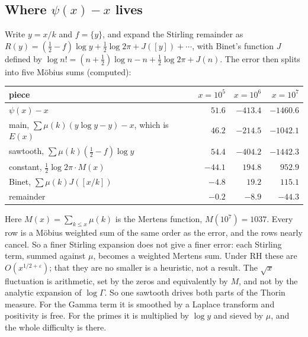 \subsection*{Where $\psi(x)-x$ lives}
Write $y=x/k$ and $f=\{y\}$, and expand the Stirling remainder as $R(y)=(\frac12-f)\log y+\frac12\log2\pi+J([y])+\cdots$, with Binet's function $J$ defined by $\log n!=(n+\frac12)\log n-n+\frac12\log2\pi+J(n)$. The error then splits into five Möbius sums (computed):
\begin{center}
\small
\begin{tabular}{lrrr}
\toprule
piece & $x=10^5$ & $x=10^6$ & $x=10^7$\\
\midrule
$\psi(x)-x$ & $51.6$ & $-413.4$ & $-1460.6$\\
main, $\sum\mu(k)(y\log y-y)-x$, which is $E(x)$ & $46.2$ & $-214.5$ & $-1042.1$\\
sawtooth, $\sum\mu(k)(\frac12-f)\log y$ & $54.4$ & $-404.2$ & $-1442.3$\\
constant, $\frac12\log2\pi\cdot M(x)$ & $-44.1$ & $194.8$ & $952.9$\\
Binet, $\sum\mu(k)J([x/k])$ & $-4.8$ & $19.2$ & $115.1$\\
remainder & $-0.2$ & $-8.9$ & $-44.3$\\
\bottomrule
\end{tabular}
\end{center}
Here $M(x)=\sum_{k\le x}\mu(k)$ is the Mertens function, $M(10^7)=1037$. Every row is a Möbius weighted sum of the same order as the error, and the rows nearly cancel. So a finer Stirling expansion does not give a finer error: each Stirling term, summed against $\mu$, becomes a weighted Mertens sum. Under RH these are $O(x^{1/2+\varepsilon})$; that they are no smaller is a heuristic, not a result. The $\sqrt x$ fluctuation is arithmetic, set by the zeros and equivalently by $M$, and not by the analytic expansion of $\log\Gamma$. So one sawtooth drives both parts of the Thorin measure. For the Gamma term it is smoothed by a Laplace transform and positivity is free. For the primes it is multiplied by $\log y$ and sieved by $\mu$, and the whole difficulty is there.

